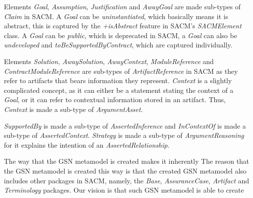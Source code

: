 Elements \textit{Goal}, \textit{Assumption}, \textit{Justification} and \textit{AwayGoal} are made sub-types of \textit{Claim} in SACM. A \textit{Goal} can be \textit{uninstantiated}, which basically means it is abstract, this is captured by the \textit{+isAbstract} feature in SACM's \textit{SACMElement} class. A \textit{Goal} can be \textit{public}, which is deprecated in SACM, a \textit{Goal} can also be \textit{undeveloped} and \textit{toBeSupportedByContract}, which are captured individually. 

Elements \textit{Solution}, \textit{AwaySolution}, \textit{AwayContext}, \textit{ModuleReference} and \textit{ContractModuleReference} are sub-types of \textit{ArtifactReference} in SACM as they refer to artifacts that bears information they represent. \textit{Context} is a slightly complicated concept, as it can either be a statement stating the context of a \textit{Goal}, or it can refer to contextual information stored in an artifact. Thus, \textit{Context} is made a sub-type of \textit{ArgumentAsset}. 

\textit{SupportedBy} is made a sub-type of \textit{AssertedInference} and \textit{InContextOf} is made a sub-type of \textit{AssertedContext}. \textit{Strategy} is made a sub-type of \textit{ArgumentReasoning} for it explains the intention of an \textit{AssertedRelationship}.

The way that the GSN metamodel is created makes it inherently  
The reason that the GSN metamodel is created this way is that the created GSN metamodel also includes other packages in SACM, namely, the \textit{Base}, \textit{AssuranceCase}, \textit{Artifact} and \textit{Terminology} packages. Our vision is that such GSN metamodel is able to create